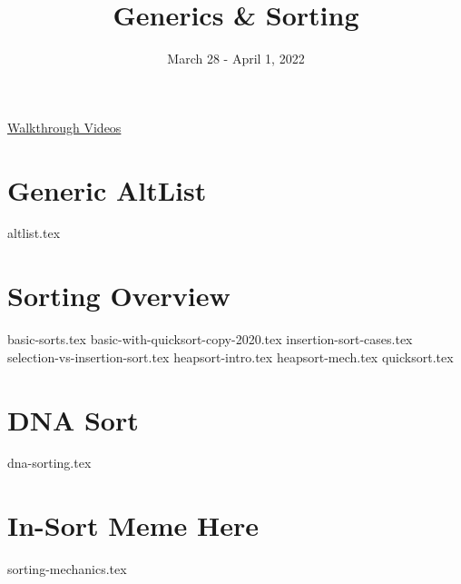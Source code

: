 \documentclass[11pt]{exam}
\title{Generics \& Sorting}
\date{March 28 - April 1, 2022}
\begin{document}
\maketitle

\href{https://youtube.com/playlist?list=PLN303KpCz_KRVG7-lorwS23aQIm5oh1fu}{Walkthrough Videos}

\section{Generic AltList}
\begin{questions}
{altlist.tex}
\end{questions}


\section{Sorting Overview}
\begin{questions}
{basic-sorts.tex}
{basic-with-quicksort-copy-2020.tex}
{insertion-sort-cases.tex}
\vspace{15mm}
{selection-vs-insertion-sort.tex}
\vspace{15mm}
{heapsort-intro.tex}
\vspace{20mm}
{heapsort-mech.tex}
\vspace{20mm}
{quicksort.tex}
\end{questions}
\clearpage

\section{DNA Sort}
\begin{questions}
{dna-sorting.tex}
\end{questions}
\clearpage


\section{In-Sort Meme Here}
\begin{questions}
{sorting-mechanics.tex}
\end{questions}
\clearpage
\end{document}

